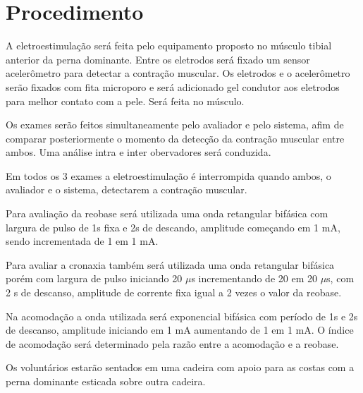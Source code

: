 \section{Procedimento}
A eletroestimulação será feita pelo equipamento proposto no músculo tibial anterior da perna dominante. Entre os eletrodos será fixado um sensor acelerômetro para detectar a contração muscular. Os eletrodos e o acelerômetro serão fixados com fita microporo e será adicionado gel condutor aos eletrodos para melhor contato com a pele. Será feita  no músculo.

Os exames serão feitos simultaneamente pelo avaliador e pelo sistema, afim de comparar posteriormente o momento da detecção da contração muscular entre ambos. Uma análise intra e inter obervadores será conduzida.

Em todos os 3 exames a eletroestimulação é interrompida quando ambos, o avaliador e o sistema, detectarem a contração muscular.

Para avaliação da reobase será utilizada uma onda retangular bifásica com largura de pulso de 1s fixa e 2s de descando, amplitude começando em 1 mA, sendo incrementada de 1 em 1 mA.

Para avaliar a cronaxia também será utilizada uma onda retangular bifásica porém com largura de pulso iniciando 20 $\mu$s incrementando de 20 em 20 $\mu$s, com 2 s de descanso, amplitude de corrente fixa igual a 2 vezes o valor da reobase.

Na acomodação a onda utilizada será exponencial bifásica com período de 1s e 2s de descanso, amplitude iniciando em 1 mA aumentando de 1 em 1 mA.
O índice de acomodação será determinado pela razão entre a acomodação e a reobase.

Os voluntários estarão sentados em uma cadeira com apoio para as costas com a perna dominante esticada sobre outra cadeira.